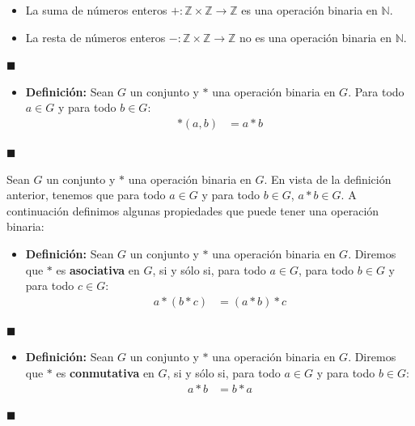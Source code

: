\documentclass[10 pt]{article}
\begin{document}
\begin{itemize}
\item \Large{La suma de números enteros $+:\mathbb Z \times \mathbb Z \rightarrow \mathbb Z$ es una operación binaria en $\mathbb N$.} \\

\item \Large{La resta de números enteros $-:\mathbb Z \times \mathbb Z \rightarrow \mathbb Z$ no es una operación binaria en $\mathbb N$.} \\
\end{itemize}

\begin{flushright}
$\blacksquare$
\end{flushright}

\begin{itemize}
    \item \Large{\textbf{Definición:} Sean $G$ un conjunto y $*$ una operación binaria en $G$. Para todo $a \in G$ y para todo $b \in G$:}
    \begin{align*}
        *(a,b)&=a*b
    \end{align*}
\end{itemize}
\begin{flushright}
    $\blacksquare$
\end{flushright}

\Large{Sean $G$ un conjunto y $*$ una operación binaria en $G$. En vista de la definición anterior, tenemos que para todo $a \in G$ y para todo $b \in G$, $a*b \in G$. A continuación definimos algunas propiedades que puede tener una operación binaria:} \\

\begin{itemize}
    \item \Large{\textbf{Definición:} Sean $G$ un conjunto y $*$ una operación binaria en $G$. Diremos que $*$ es \textbf{asociativa} en $G$, si y sólo si, para todo $a \in G$, para todo $b \in G$ y para todo $c \in G$:}
    \begin{align*}
        a*(b*c)&=(a*b)*c
    \end{align*}
\end{itemize}
\begin{flushright}
    $\blacksquare$
\end{flushright}

\begin{itemize}
    \item \Large{\textbf{Definición:} Sean $G$ un conjunto y $*$ una operación binaria en $G$. Diremos que $*$ es \textbf{conmutativa} en $G$, si y sólo si, para todo $a \in G$ y para todo $b \in G$:}
    \begin{align*}
        a*b&=b*a
    \end{align*}
\end{itemize}
\begin{flushright}
    $\blacksquare$
\end{flushright}
\end{document}
